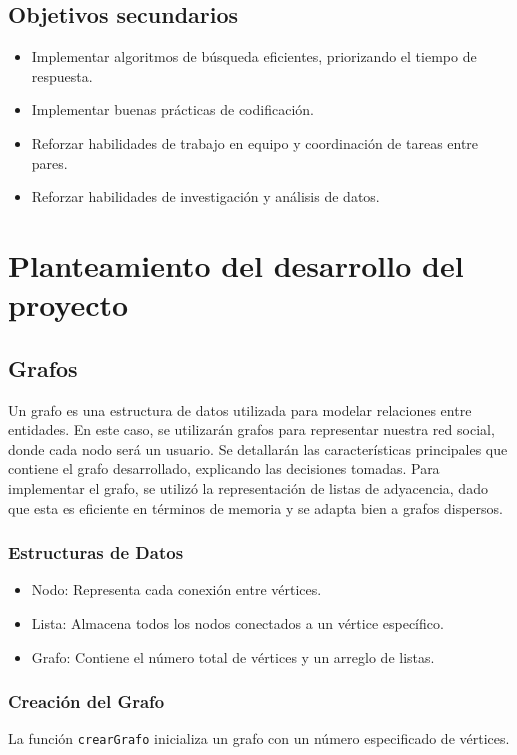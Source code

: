 \documentclass[9pt,letterpaper,onecolumn]{rho-class/rho}
\begin{document}
    \subsection{Objetivos secundarios}
    \begin{itemize}
        \item Implementar algoritmos de búsqueda eficientes, priorizando el tiempo de respuesta.
        \item Implementar buenas prácticas de codificación.
        \item Reforzar habilidades de trabajo en equipo y coordinación de tareas entre pares.
        \item Reforzar habilidades de investigación y análisis de datos.
    \end{itemize}

\newpage
\section{Planteamiento del desarrollo del proyecto}

    \subsection{Grafos}
    Un grafo es una estructura de datos utilizada para modelar relaciones entre entidades.
    En este caso, se utilizarán grafos para representar nuestra red social, donde cada nodo será un usuario.
    Se detallarán las características principales que contiene el grafo desarrollado, explicando las decisiones tomadas. 
    Para implementar el grafo, se utilizó la representación de listas de adyacencia, dado que esta es eficiente en términos de memoria y se adapta bien a grafos dispersos.

    \subsubsection{Estructuras de Datos}
    \begin{itemize}
        \item Nodo: Representa cada conexión entre vértices.
        \item Lista: Almacena todos los nodos conectados a un vértice específico.
        \item Grafo: Contiene el número total de vértices y un arreglo de listas.
    \end{itemize}

    \subsubsection{Creación del Grafo}
    La función \texttt{crearGrafo} inicializa un grafo con un número especificado de vértices.
\end{document}
